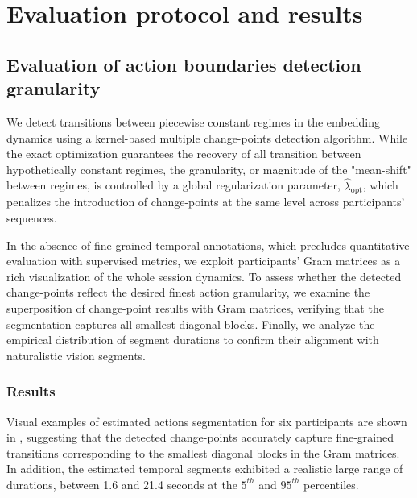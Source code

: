         

\section{Evaluation protocol and results}
\label{sec:chapter_5_evaluation_protocol}

    \subsection{Evaluation of action boundaries detection granularity}
    \label{sec:chapter_5_results_temporal_segmentation}

        We detect transitions between piecewise constant regimes in the embedding dynamics using a kernel-based multiple change-points detection algorithm. While the exact optimization guarantees the recovery of all transition between hypothetically constant regimes, the granularity, or magnitude of the "mean-shift" between regimes, is controlled by a global regularization parameter, $\hat{\lambda}_{\text{opt}}$, which penalizes the introduction of change-points at the same level across participants' sequences.
        
        In the absence of fine-grained temporal annotations, which precludes quantitative evaluation with supervised metrics, we exploit participants’ Gram matrices as a rich visualization of the whole session dynamics. To assess whether the detected change-points reflect the desired finest action granularity, we examine the superposition of change-point results with Gram matrices, verifying that the segmentation captures all smallest diagonal blocks. Finally, we analyze the empirical distribution of segment durations to confirm their alignment with naturalistic vision segments.

        \subsubsection{Results}
        Visual examples of estimated actions segmentation for six participants are shown in , suggesting that the detected change-points accurately capture fine-grained transitions corresponding to the smallest diagonal blocks in the Gram matrices. In addition, the estimated temporal segments exhibited a realistic large range of durations, between 1.6 and 21.4 seconds at the $5^{th}$ and $95^{th}$ percentiles. 

